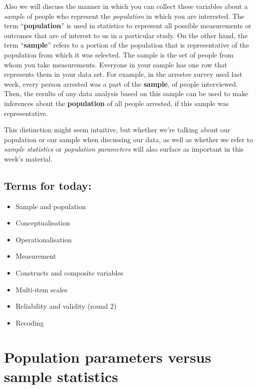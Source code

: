 \documentclass[]{book}
\providecommand{\tightlist}{%
  \setlength{\itemsep}{0pt}\setlength{\parskip}{0pt}}
\theoremstyle{definition}
\theoremstyle{definition}
\theoremstyle{definition}
\theoremstyle{remark}
\begin{document}
Also we will discuss the manner in which you can collect these variables
about a \emph{sample} of people who represent the \emph{population} in
which you are interested. The term ``\textbf{population}'' is used in
statistics to represent all possible measurements or outcomes that are
of interest to us in a particular study. On the other hand, the term
``\textbf{sample}'' refers to a portion of the population that is
representative of the population from which it was selected. The sample
is the set of people from whom you take measurements. Everyone in your
sample has one row that represents them in your data set. For example,
in the arrestee survey used last week, every person arrested was a part
of the \textbf{sample}, of people interviewed. Then, the results of any
data analysis based on this sample can be used to make inferences about
the \textbf{population} of all people arrested, if this sample was
representative.

This distinction might seem intuitive, but whether we're talking about
our population or our sample when discussing our data, as well as
whether we refer to \emph{sample statistics} or \emph{population
parameters} will also surface as important in this week's material.

\hypertarget{terms-for-today-2}{%
\subsection{Terms for today:}\label{terms-for-today-2}}

\begin{itemize}
\tightlist
\item
  Sample and population
\item
  Conceptualisation
\item
  Operationalisation
\item
  Measurement
\item
  Constructs and composite variables
\item
  Multi-item scales
\item
  Reliability and validity (round 2)
\item
  Recoding
\end{itemize}

\hypertarget{population-parameters-versus-sample-statistics}{%
\section{Population parameters versus sample
statistics}\label{population-parameters-versus-sample-statistics}}
\end{document}
